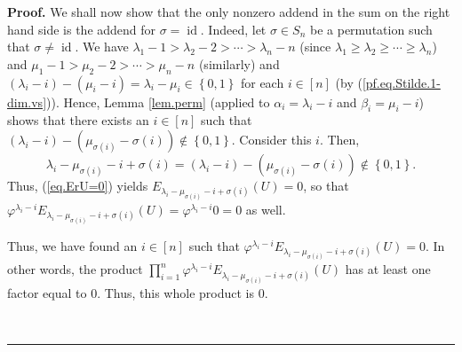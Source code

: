 \documentclass[numbers=enddot,12pt,final,onecolumn,notitlepage]{scrartcl}%
\numberwithin{exer}{section}
\theoremstyle{definition}
\newenvironment{proof}[1][Proof]{\noindent\textbf{#1.} }{\ \rule{0.5em}{0.5em}}
\let\prodnonlimits\prod
\renewcommand{\prod}{\prodnonlimits\limits}
\theoremstyle{plainsl}
\begin{document}
\begin{proof}
We shall now show that the only nonzero addend in the sum on the right hand
side is the addend for $\sigma=\operatorname*{id}$. Indeed, let $\sigma\in
S_{n}$ be a permutation such that $\sigma\neq\operatorname*{id}$. We have
$\lambda_{1}-1>\lambda_{2}-2>\cdots>\lambda_{n}-n$ (since $\lambda_{1}%
\geq\lambda_{2}\geq\cdots\geq\lambda_{n}$) and $\mu_{1}-1>\mu_{2}-2>\cdots
>\mu_{n}-n$ (similarly) and $\left(  \lambda_{i}-i\right)  -\left(  \mu
_{i}-i\right)  =\lambda_{i}-\mu_{i}\in\left\{  0,1\right\}  $ for each
$i\in\left[  n\right]  $ (by (\ref{pf.eq.Stilde.1-dim.vs})). Hence, Lemma
\ref{lem.perm} (applied to $\alpha_{i}=\lambda_{i}-i$ and $\beta_{i}=\mu
_{i}-i$) shows that there exists an $i\in\left[  n\right]  $ such that
$\left(  \lambda_{i}-i\right)  -\left(  \mu_{\sigma\left(  i\right)  }%
-\sigma\left(  i\right)  \right)  \notin\left\{  0,1\right\}  $. Consider this
$i$. Then,
\[
\lambda_{i}-\mu_{\sigma\left(  i\right)  }-i+\sigma\left(  i\right)  =\left(
\lambda_{i}-i\right)  -\left(  \mu_{\sigma\left(  i\right)  }-\sigma\left(
i\right)  \right)  \notin\left\{  0,1\right\}  .
\]
Thus, (\ref{eq.ErU=0}) yields $E_{\lambda_{i}-\mu_{\sigma\left(  i\right)
}-i+\sigma\left(  i\right)  }\left(  U\right)  =0$, so that $\varphi
^{\lambda_{i}-i}E_{\lambda_{i}-\mu_{\sigma\left(  i\right)  }-i+\sigma\left(
i\right)  }\left(  U\right)  =\varphi^{\lambda_{i}-i}0=0$ as well.

Thus, we have found an $i\in\left[  n\right]  $ such that $\varphi
^{\lambda_{i}-i}E_{\lambda_{i}-\mu_{\sigma\left(  i\right)  }-i+\sigma\left(
i\right)  }\left(  U\right)  =0$. In other words, the product $\prod_{i=1}%
^{n}\varphi^{\lambda_{i}-i}E_{\lambda_{i}-\mu_{\sigma\left(  i\right)
}-i+\sigma\left(  i\right)  }\left(  U\right)  $ has at least one factor equal
to $0$. Thus, this whole product is $0$.


\end{proof}
\end{document}
